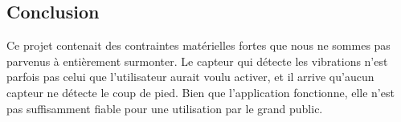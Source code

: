 \documentclass[11pt,a4paper,twoside,svgnames]{article}
\begin{document}
	\subsection{Conclusion}
	
	Ce projet contenait des contraintes matérielles fortes que nous ne sommes pas parvenus à entièrement surmonter. Le capteur qui détecte les vibrations n'est parfois pas celui que l'utilisateur aurait voulu activer, et il arrive qu'aucun capteur ne détecte le coup de pied. Bien que l'application fonctionne, elle n'est pas suffisamment fiable pour une utilisation par le grand public.
	
\end{document}
